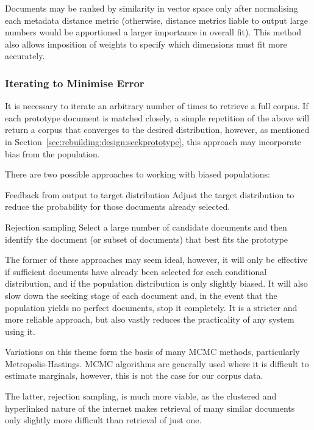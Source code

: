 Documents may be ranked by similarity in vector space only after normalising each metadata distance metric (otherwise, distance metrics liable to output large numbers would be apportioned a larger importance in overall fit).  This method also allows imposition of weights to specify which dimensions must fit more accurately.


\subsubsection{Iterating to Minimise Error}
\label{sec:rebuilding:design:minerr}
It is necessary to iterate an arbitrary number of times to retrieve a full corpus.  If each prototype document is matched closely, a simple repetition of the above will return a corpus that converges to the desired distribution, however, as mentioned in Section~\ref{sec:rebuilding:design:seekprototype}, this approach may incorporate bias from the population.

There are two possible approaches to working with biased populations:

\begin{itemizeTitle}
    \item[Feedback from output to target distribution] Adjust the target distribution to reduce the probability for those documents already selected.
    \item[Rejection sampling]  Select a large number of candidate documents and then identify the document (or subset of documents) that best fits the prototype
\end{itemizeTitle}

The former of these approaches may seem ideal, however, it will only be effective if sufficient documents have already been selected for each conditional distribution, and if the population distribution is only slightly biased.  It will also slow down the seeking stage of each document and, in the event that the population yields no perfect documents, stop it completely.  It is a stricter and more reliable approach, but also vastly reduces the practicality of any system using it.

Variations on this theme form the basis of many MCMC methods, particularly Metropolis-Hastings.  MCMC algorithms are generally used where it is difficult to estimate marginals, however, this is not the case for our corpus data.


The latter, rejection sampling, is much more viable, as the clustered and hyperlinked nature of the internet makes retrieval of many similar documents only slightly more difficult than retrieval of just one.

